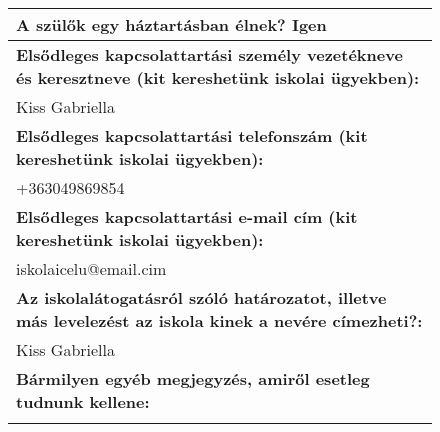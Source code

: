 \documentclass[10pt,a4paper]{article}
\begin{document}
\begin{figure}[!ht]
\begin{tabular}{|m{\textwidth}|}
\hline\vspace{3pt}
\textbf{A szülők egy háztartásban élnek? } \hspace{0.5cm} Igen \vspace{3pt} \\
\hline\vspace{3pt}
\textbf{Elsődleges kapcsolattartási személy vezetékneve és keresztneve (kit kereshetünk iskolai ügyekben):} \\ \hspace{0.5cm} Kiss Gabriella \vspace{3pt} \\
\hline\vspace{3pt}
\textbf{Elsődleges kapcsolattartási telefonszám (kit kereshetünk iskolai ügyekben):} \\ \hspace{0.5cm} +363049869854 \vspace{3pt} \\
\hline\vspace{3pt}
\textbf{Elsődleges kapcsolattartási e-mail cím (kit kereshetünk iskolai ügyekben):} \\ \hspace{0.5cm} iskolaicelu@email.cim \vspace{3pt} \\
\hline\vspace{3pt}
\textbf{Az iskolalátogatásról szóló határozatot, illetve más levelezést az iskola kinek a nevére címezheti?:} \\ \hspace{0.5cm} Kiss Gabriella \vspace{3pt} \\
\hline\vspace{3pt}
\textbf{Bármilyen egyéb megjegyzés, amiről esetleg tudnunk kellene:} \\ \hspace{0.5cm}  \vspace{3pt} \\


\end{tabular}
\end{figure}
\end{document}
